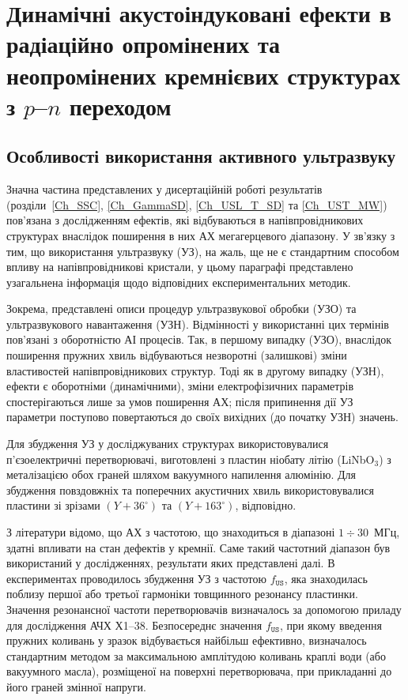 
\chapter{Динамічні акустоіндуковані ефекти в радіаційно опромінених та неопромінених кремнієвих структурах з $p$--$n$ переходом\label{Ch_SSC}}


\section{Особливості використання активного ультразвуку}
Значна частина представлених у дисертаційній роботі результатів (розділи~\ref{Ch_SSC}, \ref{Ch_GammaSD}, \ref{Ch_USL_T_SD} та \ref{Ch_UST_MW}) пов'язана з дослідженням ефектів, які відбуваються в напівпровідникових структурах внаслідок
поширення в них АХ мегагерцевого діапазону.
У зв'язку з тим, що використання ультразвуку (УЗ), на жаль, ще не є стандартним способом впливу на напівпровідникові кристали,
у цьому параграфі представлено узагальнена  інформація щодо відповідних експериментальних методик.

Зокрема, представлені описи процедур ультразвукової обробки (УЗО) та ультразвукового навантаження (УЗН).
Відмінності у використанні цих термінів пов'язані з оборотністю АІ процесів.
Так, в першому випадку (УЗО), внаслідок поширення пружних хвиль відбуваються незворотні (залишкові) зміни властивостей напівпровідникових структур.
Тоді як в другому випадку (УЗН), ефекти є оборотніми (динамічними), зміни електрофізичних параметрів спостерігаються лише за умов поширення АХ;
після припинення дії УЗ параметри поступово повертаються до своїх вихідних (до початку УЗН) значень.

Для збудження УЗ у досліджуваних структурах використовувалися п'єзоелектричні перетворювачі,
виготовлені з пластин ніобату літію (LiNbO$_3$) з металізацією обох граней шляхом вакуумного напилення алюмінію.
Для збудження повздовжніх та поперечних акустичних хвиль використовувалися пластини зі зрізами $(Y\!+\!36^\circ)$ та $(Y\!+\!163^\circ)$, відповідно.

З літератури \cite{Ostapenko1995,Davletova2008,Davletova2009,Pashaev2014r} відомо, що АХ з частотою, що знаходиться в діапазоні $1\div30$~МГц, здатні впливати на стан дефектів у кремнії.
Саме такий частотний діапазон був використаний у дослідженнях, результати яких представлені далі.
В експериментах проводилось збудження УЗ з частотою $f_\mathtt{US}$, яка знаходилась поблизу першої або третьої гармоніки товщинного резонансу пластинки.
Значення резонансної частоти перетворювачів визначалось за допомогою приладу для дослідження АЧХ Х1--38.
Безпосереднє значення $f_\mathtt{US}$, при якому введення пружних коливань у зразок відбувається найбільш ефективно, визначалось стандартним методом за максимальною амплітудою коливань краплі води (або вакуумного масла), розміщеної на поверхні перетворювача, при прикладанні до його граней змінної напруги.

